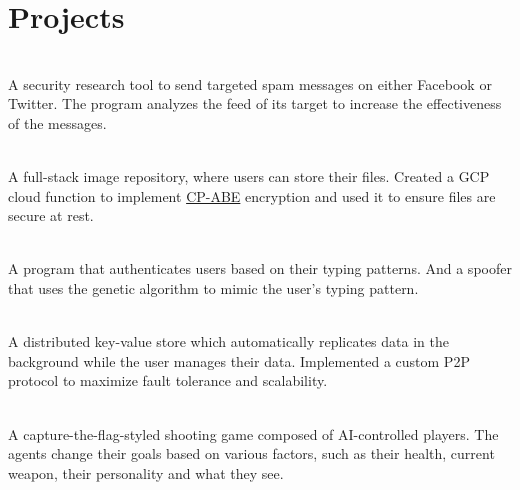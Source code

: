 \documentclass[]{resume-openfont}
\begin{document}
\section{Projects}

\\
A security research tool to send targeted spam messages on either Facebook or Twitter. The program analyzes the feed of its target to increase the effectiveness of the messages.\\
\sectionsep
  
\hfill \\
A full-stack image repository, where users can store their files. Created a GCP cloud function to implement \href{https://www.cs.utexas.edu/~bwaters/publications/papers/cp-abe.pdf}{CP-ABE} encryption and used it to ensure files are secure at rest.\\
\sectionsep

\\
A program that authenticates users based on their typing patterns. And a spoofer that uses the genetic algorithm to mimic the user's typing pattern.
\sectionsep

\\
A distributed key-value store which automatically replicates data in the background while the user manages their data. Implemented a custom P2P protocol to maximize fault tolerance and scalability.\\
\sectionsep
  

\\
A capture-the-flag-styled shooting game composed of AI-controlled players. The agents change their goals based on various factors, such as their health, current weapon, their personality and what they see.\\
\sectionsep
\end{document}
